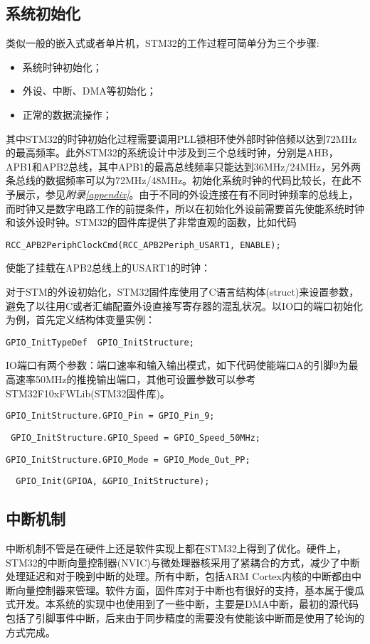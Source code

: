 \subsection{系统初始化}
类似一般的嵌入式或者单片机，STM32的工作过程可简单分为三个步骤:
\begin{itemize}
\item	系统时钟初始化；
\item	外设、中断、DMA等初始化；
\item	正常的数据流操作；
\end{itemize}
	其中STM32的时钟初始化过程需要调用PLL锁相环使外部时钟倍频以达到72MHz的最高频率。此外STM32的系统设计中涉及到三个总线时钟，分别是AHB，APB1和APB2总线，其中APB1的最高总线频率只能达到36MHz/24MHz，另外两条总线的数据频率可以为72MHz/48MHz。初始化系统时钟的代码比较长，在此不予展示，参见\textit{附录\ref{appendix}}。由于不同的外设连接在有不同时钟频率的总线上，而时钟又是数字电路工作的前提条件，所以在初始化外设前需要首先使能系统时钟和该外设时钟。STM32的固件库提供了非常直观的函数，比如代码
\begin{center}
  \verb|RCC_APB2PeriphClockCmd(RCC_APB2Periph_USART1, ENABLE);|
\end{center}

使能了挂载在APB2总线上的USART1的时钟：

	对于STM的外设初始化，STM32固件库使用了C语言结构体(struct)来设置参数，避免了以往用C或者汇编配置外设直接写寄存器的混乱状况。以IO口的端口初始化为例，首先定义结构体变量实例：
\begin{center}
\verb|GPIO_InitTypeDef  GPIO_InitStructure;|
\end{center}
IO端口有两个参数：端口速率和输入输出模式，如下代码使能端口A的引脚9为最高速率50MHz的推挽输出端口，其他可设置参数可以参考STM32F10xFWLib(STM32固件库)。
 \textit{\color{blue}{//IO口9}}

\verb|GPIO_InitStructure.GPIO_Pin = GPIO_Pin_9;| 

\textit{\color{blue}{//设置端口速率为50MHz}}

\verb| GPIO_InitStructure.GPIO_Speed = GPIO_Speed_50MHz;|

 \textit{\color{blue}{//设置端口工作模式为推挽输出}}

\verb|GPIO_InitStructure.GPIO_Mode = GPIO_Mode_Out_PP;|

 \textit{\color{blue}{//初始化该结构体到端口A}}

\verb|  GPIO_Init(GPIOA, &GPIO_InitStructure);|

\subsection{中断机制}
	中断机制不管是在硬件上还是软件实现上都在STM32上得到了优化。硬件上，STM32的中断向量控制器(NVIC)与微处理器核采用了紧耦合的方式，减少了中断处理延迟和对于晚到中断的处理。所有中断，包括ARM Cortex内核的中断都由中断向量控制器来管理。软件方面，固件库对于中断也有很好的支持，基本属于傻瓜式开发。本系统的实现中也使用到了一些中断，主要是DMA中断，最初的源代码包括了引脚事件中断，后来由于同步精度的需要没有使能该中断而是使用了轮询的方式完成。

